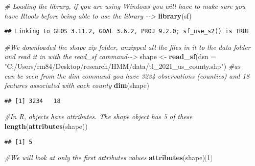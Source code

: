 \documentclass[
]{article}
\newenvironment{Shaded}{\begin{snugshade}}{\end{snugshade}}
\newcommand{\AttributeTok}[1]{\textcolor[rgb]{0.13,0.29,0.53}{#1}}
\newcommand{\CommentTok}[1]{\textcolor[rgb]{0.56,0.35,0.01}{\textit{#1}}}
\newcommand{\DecValTok}[1]{\textcolor[rgb]{0.00,0.00,0.81}{#1}}
\newcommand{\FunctionTok}[1]{\textcolor[rgb]{0.13,0.29,0.53}{\textbf{#1}}}
\newcommand{\NormalTok}[1]{#1}
\newcommand{\OtherTok}[1]{\textcolor[rgb]{0.56,0.35,0.01}{#1}}
\newcommand{\StringTok}[1]{\textcolor[rgb]{0.31,0.60,0.02}{#1}}
\begin{document}
\begin{Shaded}
\begin{Highlighting}[]
\CommentTok{\# Loading the library, if you are using Windows you will have to make sure you have Rtools before being able to use the library {-}{-}\textgreater{}}
\FunctionTok{library}\NormalTok{(sf)}
\end{Highlighting}
\end{Shaded}

\begin{verbatim}
## Linking to GEOS 3.11.2, GDAL 3.6.2, PROJ 9.2.0; sf_use_s2() is TRUE
\end{verbatim}

\begin{Shaded}
\begin{Highlighting}[]
\CommentTok{\#We downloaded the shape zip folder, unzipped all the files in it to the data folder and read it in with the read\_sf command{-}{-}\textgreater{} }
\NormalTok{shape }\OtherTok{\textless{}{-}} \FunctionTok{read\_sf}\NormalTok{(}\AttributeTok{dsn =} \StringTok{"C:/Users/rm84/Desktop/research/HMM/data/tl\_2021\_us\_county.shp"}\NormalTok{)}
\CommentTok{\#as can be seen from the dim command you have 3234 observations (counties) and 18 features associated with each county}
\FunctionTok{dim}\NormalTok{(shape)}
\end{Highlighting}
\end{Shaded}

\begin{verbatim}
## [1] 3234   18
\end{verbatim}

\begin{Shaded}
\begin{Highlighting}[]
\CommentTok{\#In R, objects have attributes. The shape object has 5 of these}
\FunctionTok{length}\NormalTok{(}\FunctionTok{attributes}\NormalTok{(shape))}
\end{Highlighting}
\end{Shaded}

\begin{verbatim}
## [1] 5
\end{verbatim}

\begin{Shaded}
\begin{Highlighting}[]
\CommentTok{\#We will look at only the first attribute\textquotesingle{}s values}
\FunctionTok{attributes}\NormalTok{(shape)[}\DecValTok{1}\NormalTok{]}
\end{Highlighting}
\end{Shaded}
\end{document}
